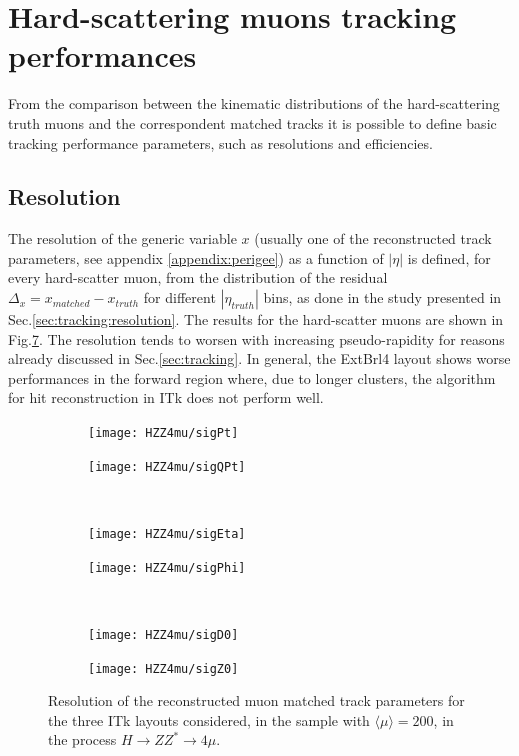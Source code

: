 \documentclass[a4paper,twoside,12pt]{book}
\begin{document}
\section{Hard-scattering muons tracking performances}
From the comparison between the kinematic distributions of the hard-scattering truth muons and the correspondent matched 
tracks it is possible to define basic tracking performance parameters, such as resolutions and efficiencies. \\

\subsection*{Resolution}
The resolution of the generic variable $x$ (usually one of the reconstructed track parameters, see appendix \ref{appendix:perigee}) as a function of $|\eta|$ is defined, for every hard-scatter muon, from the distribution of the residual 
$\Delta_x = x_{matched} - x_{truth}$ for different $|\eta_{truth}|$ bins, as done in the study presented in Sec.\ref{sec:tracking:resolution}. 
The results for the hard-scatter muons are shown in Fig.\ref{fig:HZZ4mu:muonResolution}.
The resolution tends to worsen 
with increasing pseudo-rapidity for reasons already discussed in Sec.\ref{sec:tracking}. In general, the ExtBrl4 layout shows worse performances in the forward region where, due to longer clusters, the algorithm for hit reconstruction in ITk
does not perform well.\\


\begin{figure}
\begin{subfigure}{.5\linewidth}
\texttt{[image: HZZ4mu/sigPt]}
\caption{}
\label{fig:HZZ4mu:sigPt}
\end{subfigure}
\begin{subfigure}{.5\linewidth}
\texttt{[image: HZZ4mu/sigQPt]}
\caption{}
\label{fig:HZZ4mu:sigQPt}
\end{subfigure}\\[1ex]
\begin{subfigure}{.5\linewidth}
\texttt{[image: HZZ4mu/sigEta]}
\caption{}
\label{fig:HZZ4mu:sigEta}
\end{subfigure}
\begin{subfigure}{.5\linewidth}
\texttt{[image: HZZ4mu/sigPhi]}
\caption{}
\label{fig:HZZ4mu:sigPhi}
\end{subfigure}\\[1ex]
\begin{subfigure}{.5\linewidth}
\texttt{[image: HZZ4mu/sigD0]}
\caption{}
\label{fig:HZZ4mu:sigD0}
\end{subfigure}
\begin{subfigure}{.5\linewidth}
\texttt{[image: HZZ4mu/sigZ0]}
\caption{}
\label{fig:HZZ4mu:sigZ0}
\end{subfigure}
\caption{Resolution of the reconstructed muon matched track parameters for the three ITk layouts considered, in the sample with $\langle\mu\rangle = 200$, in the process $H \rightarrow ZZ^* \rightarrow 4\mu$.}
\label{fig:HZZ4mu:muonResolution}
\end{figure}
\end{document}
